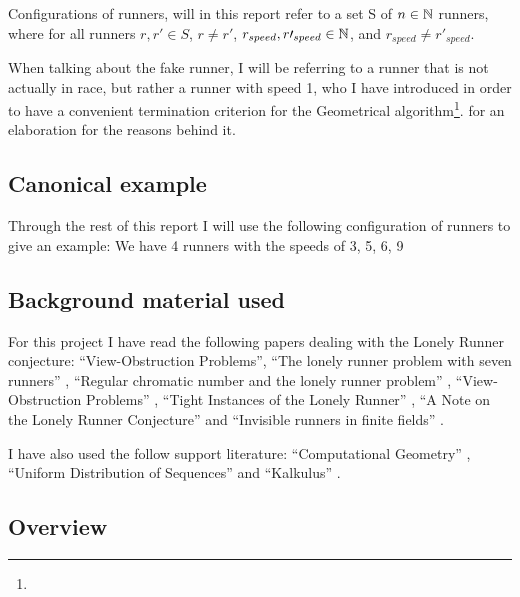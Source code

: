 \begin{defi}
\label{def:config}
Configurations of runners, will in this report refer to a set S of $n \in \mathbb{N}$ runners, where for all runners $r, r\prime \in S$, $r \neq r\prime$, $r_{speed}, r\prime_{speed} \in \mathbb{N}$, and $r_{speed} \neq r\prime_{speed}$.
\end{defi}

\begin{defi}
\label{def:fakeRunner}
When talking about the fake runner, I will be referring to a runner that is not actually in race, but rather a runner with speed 1, who I have introduced in order to have a convenient termination criterion for the Geometrical algorithm\footnote{}.  for an elaboration for the reasons behind it.
\end{defi}  

\subsection{Canonical example}
Through the rest of this report I will use the following configuration
of runners to give an example:
We have 4 runners with the speeds of 3, 5, 6, 9

\subsection{Background material used}
\label{background}
For this project I have read the following papers dealing with the Lonely Runner conjecture: ``View-Obstruction Problems''\cite{Bienia97flows.view-obstructions}, ``The lonely runner problem with seven runners'' \cite{serra_thelonely}, ``Regular chromatic number and the lonely runner problem'' \cite{Barajas2007479}, ``View-Obstruction Problems'' \cite{springerlink:10.1007/BF01832623}, ``Tight Instances of the Lonely Runner'' \cite{Goddyn96tightinstances}, ``A Note on the Lonely Runner Conjecture'' \cite{ANote} and ``Invisible runners in finite fields'' \cite{invis}.

I have also used the follow support literature:
``Computational Geometry'' \cite{citeulike:3347056}, ``Uniform Distribution of Sequences'' \cite{uniform} and ``Kalkulus'' \cite{kalkulus}.

\subsection{Overview}

